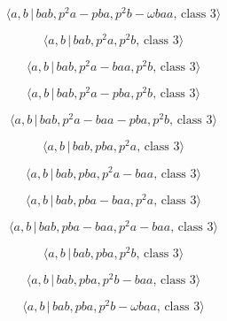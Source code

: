 \documentclass[10pt]{article}
\begin{document}
\begin{equation}
\langle a,b\,|\,bab,p^{2}a-pba,p^{2}b-\omega baa,\,\text{class }3\rangle 
\tag{7.14}
\end{equation}

\begin{equation}
\langle a,b\,|\,bab,p^2a,p^2b,\,\text{class }3\rangle  \tag{7.15}
\end{equation}

\begin{equation}
\langle a,b\,|\,bab,p^2a-baa,p^2b,\,\text{class }3\rangle  \tag{7.16}
\end{equation}

\begin{equation}
\langle a,b\,|\,bab,p^2a-pba,p^2b,\,\text{class }3\rangle  \tag{7.17}
\end{equation}

\begin{equation}
\langle a,b\,|\,bab,p^2a-baa-pba,p^2b,\,\text{class }3\rangle  \tag{7.18}
\end{equation}

\begin{equation}
\langle a,b\,|\,bab,pba,p^2a,\,\text{class }3\rangle  \tag{7.19}
\end{equation}

\begin{equation}
\langle a,b\,|\,bab,pba,p^2a-baa,\,\text{class }3\rangle  \tag{7.20}
\end{equation}

\begin{equation}
\langle a,b\,|\,bab,pba-baa,p^2a,\,\text{class }3\rangle  \tag{7.21}
\end{equation}

\begin{equation}
\langle a,b\,|\,bab,pba-baa,p^2a-baa,\,\text{class }3\rangle  \tag{7.22}
\end{equation}

\begin{equation}
\langle a,b\,|\,bab,pba,p^2b,\,\text{class }3\rangle  \tag{7.23}
\end{equation}

\begin{equation}
\langle a,b\,|\,bab,pba,p^2b-baa,\,\text{class }3\rangle  \tag{7.24}
\end{equation}

\begin{equation}
\langle a,b\,|\,bab,pba,p^{2}b-\omega baa,\,\text{class }3\rangle  \tag{7.25}
\end{equation}
\end{document}

